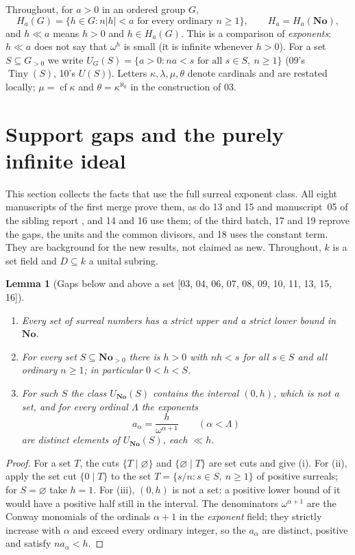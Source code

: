\documentclass[11pt,letterpaper]{article}
\numberwithin{equation}{section}
\newtheorem{lemma}[lemma]{Lemma}
\theoremstyle{definition}
\theoremstyle{remark}
\theoremstyle{plain}
\newcommand{\No}{\mathbf{No}}
\newcommand{\cf}{\operatorname{cf}}
\newcommand{\src}[1]{\textup{\textsf{[#1]}}}
\begin{document}
Throughout, for $a>0$ in an ordered group $G$,
\begin{equation}\label{osq:eq:Ha}
 H_a(G)=\{h\in G: n|h|<a\text{ for every ordinary }n\ge1\},\qquad H_a=H_a(\No),
\end{equation}
and $h\ll a$ means $h>0$ and $h\in H_a(G)$. This is a comparison of \emph{exponents}:
$h\ll a$ does not say that $\omega^h$ is small (it is infinite whenever $h>0$). For a set
$S\subseteq G_{>0}$ we write $U_G(S)=\{a>0: na<s\text{ for all }s\in S,\ n\ge1\}$ (09's
$\operatorname{Tiny}(S)$, 10's $U(S)$). Letters $\kappa,\lambda,\mu,\theta$ denote
cardinals and are restated locally; $\mu=\cf\kappa$ and $\theta=\kappa^{\aleph_0}$ in
the construction of 03.

\section{Support gaps and the purely infinite ideal}\label{osq:sec:gaps}

This section collects the facts that use the full surreal exponent class. All eight
manuscripts of the first merge prove them, as do 13 and 15 and manuscript~05 of the sibling
report \cite{RepoOdg}, and 14 and 16 use them; of the third batch, 17 and 19 reprove the gaps, the
units and the common divisors, and 18 uses the constant term. They are background for the new results, not
claimed as new. Throughout, $k$ is a set
field and $D\subseteq k$ a unital subring.

\begin{lemma}[Gaps below and above a set \src{03, 04, 06, 07, 08, 09, 10, 11, 13, 15, 16}]\label{osq:lem:gap}
\leavevmode
\begin{enumerate}
\item Every set of surreal numbers has a strict upper and a strict lower bound in $\No$.
\item For every set $S\subseteq\No_{>0}$ there is $h>0$ with $nh<s$ for all $s\in S$
and all ordinary $n\ge1$; in particular $0<h<S$.
\item For such $S$ the class $U_{\No}(S)$ contains the interval $(0,h)$, which is not a
set, and for every ordinal $\Lambda$ the exponents
\begin{equation}\label{osq:eq:scales}
 a_\alpha=\frac{h}{\omega^{\alpha+1}}\qquad(\alpha<\Lambda)
\end{equation}
are distinct elements of $U_{\No}(S)$, each $\ll h$.
\end{enumerate}
\end{lemma}
\begin{proof}
For a set $T$, the cuts $\{T\mid\varnothing\}$ and $\{\varnothing\mid T\}$ are set cuts
and give (i). For (ii), apply the set cut $\{0\mid T\}$ to the set
$T=\{s/n:s\in S,\ n\ge1\}$ of positive surreals; for $S=\varnothing$ take $h=1$. For
(iii), $(0,h)$ is not a set: a positive lower bound of it would have a positive half still
in the interval. The denominators $\omega^{\alpha+1}$ are the Conway monomials of the
ordinals $\alpha+1$ in the \emph{exponent} field; they strictly increase with $\alpha$ and
exceed every ordinary integer, so the $a_\alpha$ are distinct, positive and satisfy
$na_\alpha<h$.
\end{proof}
\end{document}

